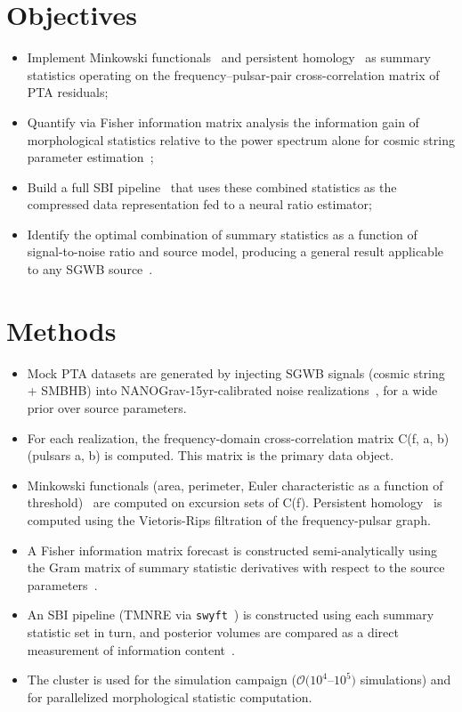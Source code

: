 \section{Objectives}\label{sec:2-objectives}
\begin{itemize}
    \item Implement Minkowski functionals~\cite{mecke_robust_1994} and persistent homology~\cite{edelsbrunner_topological_2002} as summary statistics operating on the frequency–pulsar-pair cross-correlation matrix of PTA residuals;
    \item Quantify via Fisher information matrix analysis the information gain of morphological statistics relative to the power spectrum alone for cosmic string parameter estimation~\cite{yip_cosmology_2024};
    \item Build a full SBI pipeline~\cite{cranmer_frontier_2020,alvey_simulationbased_2024} that uses these combined statistics as the compressed data representation fed to a neural ratio estimator;
    \item Identify the optimal combination of summary statistics as a function of signal-to-noise ratio and source model, producing a general result applicable to any SGWB source~\cite{renzini_stochastic_2022}.
\end{itemize}
\section{Methods}\label{sec:2-methods}

\begin{itemize}
    \item Mock PTA datasets are generated by injecting SGWB signals (cosmic string + SMBHB) into NANOGrav-15yr-calibrated noise realizations~\cite{afzal_nanograv_2023,johnson_nanograv_2024}, for a wide prior over source parameters.
    \item For each realization, the frequency-domain cross-correlation matrix C(f, a, b) (pulsars a, b) is computed. This matrix is the primary data object.
    \item Minkowski functionals (area, perimeter, Euler characteristic as a function of threshold)~\cite{mecke_robust_1994} are computed on excursion sets of C(f). Persistent homology~\cite{edelsbrunner_topological_2002} is computed using the Vietoris-Rips filtration of the frequency-pulsar graph.
    \item A Fisher information matrix forecast is constructed semi-analytically using the Gram matrix of summary statistic derivatives with respect to the source parameters~\cite{yip_cosmology_2024,jalali_kanafi_imprint_2024}.
    \item An SBI pipeline (TMNRE via \texttt{swyft}~\cite{miller_truncated_2021,miller_swyft_2022}) is constructed using each summary statistic set in turn, and posterior volumes are compared as a direct measurement of information content~\cite{alvey_simulationbased_2024}.
    \item The cluster is used for the simulation campaign ($\mathcal{O}(10^4$–$10^5)$ simulations) and for parallelized morphological statistic computation.
\end{itemize}